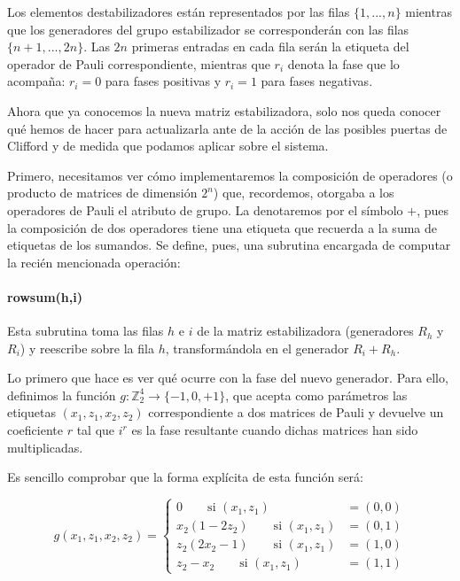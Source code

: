\documentclass[11pt,a4paper,twoside,pdf]{article}
\numberwithin{equation}{section}
\begin{document}
Los elementos destabilizadores están representados por las filas $\{1,...,n\}$ mientras que los generadores del grupo estabilizador se corresponderán con las filas $\{n+1,...,2n\}$. Las $2n$ primeras entradas en cada fila serán la etiqueta del operador de Pauli correspondiente, mientras que $r_i$ denota la fase que lo acompaña: $r_i=0$ para fases positivas y $r_i=1$ para fases negativas.


Ahora que ya conocemos la nueva matriz estabilizadora, solo nos queda conocer qué hemos de hacer para actualizarla ante de la acción de las posibles puertas de Clifford y de medida que podamos aplicar sobre el sistema.
	
Primero, necesitamos ver cómo implementaremos la composición de operadores (o producto de matrices de dimensión $2^n$) que, recordemos, otorgaba a los operadores de Pauli el atributo de grupo. La denotaremos por el símbolo $+$, pues la composición de dos operadores tiene una etiqueta que recuerda a la suma de etiquetas de los sumandos. Se define, pues, una subrutina encargada de computar la recién mencionada operación:
	\paragraph{rowsum(h,i)} Esta subrutina toma las filas $h$ e $i$ de la matriz estabilizadora (generadores $R_h$ y $R_i$) y reescribe sobre la fila $h$, transformándola en el generador $R_i+R_h$. 
		
	Lo primero que hace es ver qué ocurre con la fase del nuevo generador. Para ello, definimos la función $g:\mathbb{Z}_2^4 \longrightarrow \{-1,0,+1\}$, que acepta como parámetros las etiquetas $(x_1,z_1,x_2,z_2)$ correspondiente a dos matrices de Pauli y devuelve un coeficiente $r$ tal que $i^r$ es la fase resultante cuando dichas matrices han sido multiplicadas. 
	
	Es sencillo comprobar que la forma explícita de esta función será:
		
				\begin{equation}
					g(x_1,z_1,x_2,z_2)=\left\lbrace 
						\begin{aligned}
							0  					\qquad	   \text{si } (x_1,z_1) &= (0,0)      \\
							x_2 (1-2z_2)  \qquad	 \text{si } (x_1,z_1) &= (0,1)		  \\
							z_2 (2x_2-1)  \qquad	 \text{si } (x_1,z_1) &= (1,0) 		  \\
							z_2 - x_2		\qquad	   \text{si } (x_1,z_1) &= (1,1)      
						\end{aligned}
				 	\right. 
				\end{equation}
		
\end{document}
